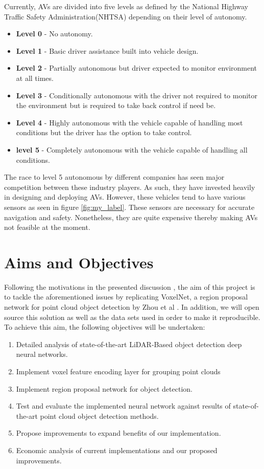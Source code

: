 Currently, AVs are divided into five levels as defined by the National Highway Traffic Safety Administration(NHTSA) depending on their level of autonomy. 
\begin{itemize}
	\item \textbf{Level 0} - No autonomy. 
	\item \textbf{Level 1} - Basic driver assistance built into vehicle design.
	\item \textbf{Level 2} - Partially autonomous but driver expected to monitor environment at all times.
	\item \textbf{Level 3} - Conditionally autonomous with the driver not required to monitor the environment but is required to take back control if need be.
	\item \textbf{Level 4} - Highly autonomous with the vehicle capable of handling most conditions but the driver has the option to take control. 
	\item \textbf{level 5} - Completely autonomous with the vehicle capable of handling all conditions.
\end{itemize}

The race to level 5 autonomous by different companies has seen major competition between these industry players. As such, they have invested heavily in designing and deploying AVs. However, these vehicles tend to have various sensors as seen in figure \ref{fig:my_label}. These sensors are necessary for accurate navigation and safety. Nonetheless, they are quite expensive thereby making AVs not feasible at the moment. 




\section{Aims and Objectives}
Following the motivations in the presented discussion , the aim of this project is to  tackle the aforementioned issues by replicating VoxelNet, a region proposal network for point cloud object detection by Zhou et al \cite{zhou2017voxelnet}. In addition, we will open source this solution as well as the data sets used in order to make it reproducible. 
To achieve this aim, the following objectives will be undertaken:
\begin{enumerate}
	\item Detailed analysis of state-of-the-art LiDAR-Based object detection deep neural networks.
	\item Implement voxel feature encoding layer for grouping point clouds
	\item Implement region proposal network for object detection.
	\item Test and evaluate the implemented neural network against results of state-of-the-art point cloud object detection methods.
	\item Propose improvements to expand benefits of our implementation.
	\item Economic analysis of current implementations and our proposed improvements. 
\end{enumerate}

